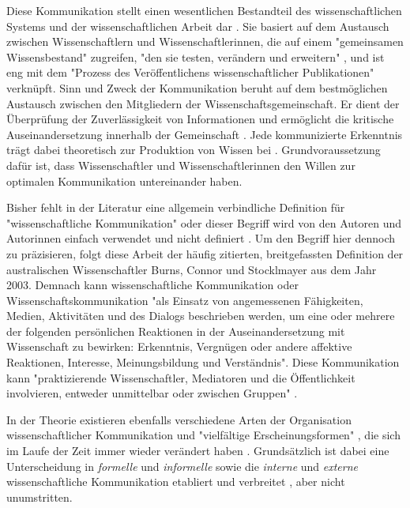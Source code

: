 Diese Kommunikation stellt einen wesentlichen Bestandteil des wissenschaftlichen Systems und der wissenschaftlichen Arbeit dar \cite{garvey_2014_communication} \cite[:63]{Luhmann1998}. Sie basiert auf dem Austausch zwischen Wissenschaftlern und Wissenschaftlerinnen, die auf einem "gemeinsamen Wissensbestand" zugreifen, "den sie testen, verändern und erweitern" \cite{Gl_ser_2007}, und ist eng mit dem "Prozess des Veröffentlichens wissenschaftlicher Publikationen" \cite{weller2011twitter} verknüpft. Sinn und Zweck der Kommunikation beruht auf dem bestmöglichen Austausch zwischen den Mitgliedern der Wissenschaftsgemeinschaft. Er dient der Überprüfung der Zuverlässigkeit von Informationen und ermöglicht die kritische Auseinandersetzung innerhalb der Gemeinschaft \cite{fox_1983_publication}. Jede kommunizierte Erkenntnis trägt dabei theoretisch zur Produktion von Wissen bei \cite{kaden_2009_library}. Grundvoraussetzung dafür ist, dass Wissenschaftler und Wissenschaftlerinnen den Willen zur optimalen Kommunikation untereinander haben.

Bisher fehlt in der Literatur eine allgemein verbindliche Definition für "wissenschaftliche Kommunikation" oder dieser Begriff wird von den Autoren und Autorinnen einfach verwendet und nicht definiert \cite[:2]{seidenfaden_2005_kommunikation}. Um den Begriff hier dennoch zu präzisieren, folgt diese Arbeit der häufig zitierten, breitgefassten Definition der australischen Wissenschaftler Burns, Connor und Stocklmayer aus dem Jahr 2003. Demnach kann wissenschaftliche Kommunikation oder Wissenschaftskommunikation "als Einsatz von angemessenen Fähigkeiten, Medien, Aktivitäten und des Dialogs beschrieben werden, um eine oder mehrere der folgenden persönlichen Reaktionen in der Auseinandersetzung mit Wissenschaft zu bewirken: Erkenntnis, Vergnügen oder andere affektive Reaktionen, Interesse, Meinungsbildung und Verständnis". Diese Kommunikation kann "praktizierende Wissenschaftler, Mediatoren und die Öffentlichkeit involvieren, entweder unmittelbar oder zwischen Gruppen" \cite[:191]{Burns_2003}.

In der Theorie existieren ebenfalls verschiedene Arten der Organisation wissenschaftlicher Kommunikation und "vielfältige Erscheinungsformen" \cite{graefen2007_wissenschaftliche_artikel}, die sich im Laufe der Zeit immer wieder verändert haben \cite{Konneker_2013} \cite{hagner_2015_sache_buches}. Grundsätzlich ist dabei eine Unterscheidung in \textit{formelle} und \textit{informelle} sowie die \textit{interne} und \textit{externe} wissenschaftliche Kommunikation etabliert und verbreitet \cite{seidenfaden_2005_kommunikation}, aber nicht unumstritten.

